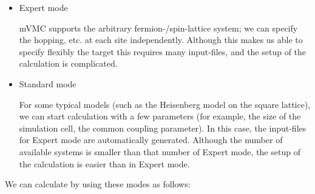 \begin{itemize}
\item Expert mode

  mVMC supports the arbitrary fermion-/spin-lattice system;
  we can specify the hopping, etc. at each site independently.
  Although this makes us able to specify flexibly the target
  this requires many input-files, and
  the setup of the calculation is complicated.

\item Standard mode

  For some typical models (such as the Heisenberg model on the square lattice),
  we can start calculation with a few parameters (for example, the size of the
  simulation cell, the common coupling parameter).
  In this case, the input-files for Expert mode are automatically generated.
  Although the number of available systems is smaller than that number of Expert mode,
  the setup of the calculation is easier than in Expert mode.

\end{itemize}

We can calculate by using these modes as follows:

